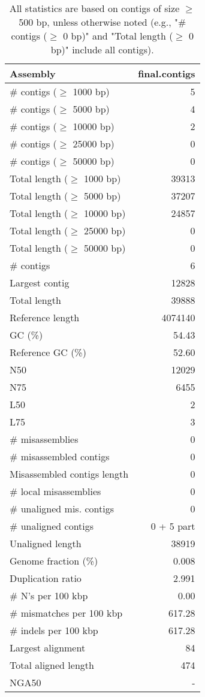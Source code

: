 \documentclass[12pt,a4paper]{article}
\begin{document}
\begin{table}[ht]
\begin{center}
\caption{All statistics are based on contigs of size $\geq$ 500 bp, unless otherwise noted (e.g., "\# contigs ($\geq$ 0 bp)" and "Total length ($\geq$ 0 bp)" include all contigs).}
\begin{tabular}{|l*{1}{|r}|}
\hline
Assembly & final.contigs \\ \hline
\# contigs ($\geq$ 1000 bp) & 5 \\ \hline
\# contigs ($\geq$ 5000 bp) & 4 \\ \hline
\# contigs ($\geq$ 10000 bp) & 2 \\ \hline
\# contigs ($\geq$ 25000 bp) & 0 \\ \hline
\# contigs ($\geq$ 50000 bp) & 0 \\ \hline
Total length ($\geq$ 1000 bp) & 39313 \\ \hline
Total length ($\geq$ 5000 bp) & 37207 \\ \hline
Total length ($\geq$ 10000 bp) & 24857 \\ \hline
Total length ($\geq$ 25000 bp) & 0 \\ \hline
Total length ($\geq$ 50000 bp) & 0 \\ \hline
\# contigs & 6 \\ \hline
Largest contig & 12828 \\ \hline
Total length & 39888 \\ \hline
Reference length & 4074140 \\ \hline
GC (\%) & 54.43 \\ \hline
Reference GC (\%) & 52.60 \\ \hline
N50 & 12029 \\ \hline
N75 & 6455 \\ \hline
L50 & 2 \\ \hline
L75 & 3 \\ \hline
\# misassemblies & 0 \\ \hline
\# misassembled contigs & 0 \\ \hline
Misassembled contigs length & 0 \\ \hline
\# local misassemblies & 0 \\ \hline
\# unaligned mis. contigs & 0 \\ \hline
\# unaligned contigs & 0 + 5 part \\ \hline
Unaligned length & 38919 \\ \hline
Genome fraction (\%) & 0.008 \\ \hline
Duplication ratio & 2.991 \\ \hline
\# N's per 100 kbp & 0.00 \\ \hline
\# mismatches per 100 kbp & 617.28 \\ \hline
\# indels per 100 kbp & 617.28 \\ \hline
Largest alignment & 84 \\ \hline
Total aligned length & 474 \\ \hline
NGA50 & - \\ \hline
\end{tabular}
\end{center}
\end{table}
\end{document}

